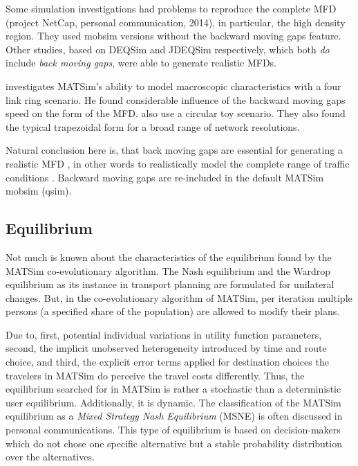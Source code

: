Some simulation investigations had problems to reproduce the complete MFD (project NetCap, personal communication, 2014), in particular, the high density region. They used mobsim versions without the backward moving gaps feature. Other studies, based on DEQSim and JDEQSim respectively, which both \emph{do} include \emph{back moving gaps}, were able to generate realistic MFDs. 

\citet[p.81ff][]{Simoni_MastersThesis_2013} investigates MATSim's ability to model macroscopic characteristics with a four link ring scenario. He found considerable influence of the backward moving gaps speed on the form of the MFD. \citet[][]{CharyparEtAl_TRB_2009} also use a circular toy scenario. They also found the typical trapezoidal form for a broad range of network resolutions.

Natural conclusion here is, that back moving gaps are essential for generating a realistic MFD , in other words to realistically model the complete range of traffic conditions . Backward moving gaps are re-included in the default MATSim mobsim (qsim). 



\subsection{Equilibrium}
\label{sec:matsimeq}
Not much is known about the characteristics of the equilibrium found by the MATSim co-evolutionary algorithm. The Nash equilibrium and the Wardrop equilibrium as its instance in transport planning are formulated for unilateral changes. But, in the co-evolutionary algorithm of MATSim, per iteration multiple persons (a specified share of the population) are allowed to modify their plans.

Due to, first, potential individual variations in utility function parameters, second, the implicit unobserved heterogeneity introduced by time and route choice, and third, the explicit error terms applied for destination choices the travelers in MATSim do perceive the travel costs differently. Thus, the equilibrium searched for in MATSim is rather a stochastic than a deterministic user equilibrium. Additionally, it is dynamic. The classification of the MATSim equilibrium as a \emph{Mixed Strategy Nash Equilibrium} (MSNE) is often discussed in personal communications. This type of equilibrium is based on decision-makers which do not chose one specific alternative but a stable probability distribution over the alternatives. 

